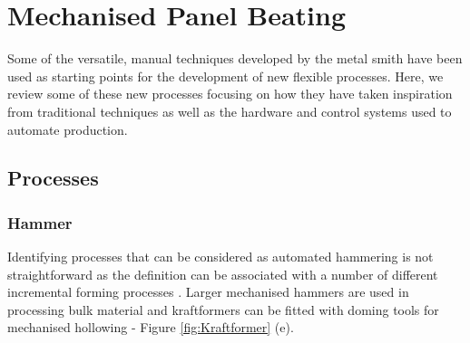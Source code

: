 








\newpage
\section{Mechanised Panel Beating} \label{sec:Mechanised}

Some of the versatile, manual techniques developed by the metal smith have been used as starting points for the development of new flexible processes. Here, we review some of these new processes focusing on how they have taken inspiration from traditional techniques as well as the hardware and control systems used to automate production.


\subsection{Processes} \label{sec:MechanisedProcess}
\subsubsection*{Hammer}
Identifying processes that can be considered as automated hammering is not straightforward as the definition can be associated with a number of different incremental forming processes \citep{Emmens2010TheHistory}. Larger mechanised hammers are used in processing bulk material \citep{Lange1986HandbookForming} and kraftformers can be fitted with doming tools for mechanised hollowing - Figure \ref{fig:Kraftformer} (e).

